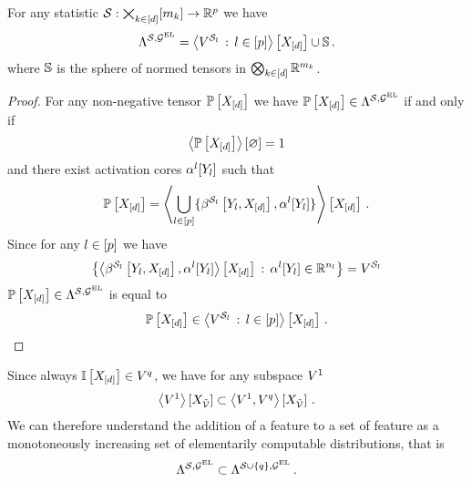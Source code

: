\begin{lemma}
    For any statistic $\mathcal{S}:\bigtimes_{k\in[d]}[m_{k}]\rightarrow\mathbb{R}^{p}$ we have
    \begin{align*}
        \Lambda^{\mathcal{S},\mathcal{G}^{\mathrm{EL}}} = \left\langle V^{\mathcal{S}_{l}} \, : \, l\in[p]\right\rangle \left[ X_{[d]} \right]  \cup \mathbb{S} \, .
    \end{align*}
    where $\mathbb{S}$ is the sphere of normed tensors in $\bigotimes_{k\in[d]} \mathbb{R}^{m_{k}}$.
\end{lemma}
\begin{proof}
    For any non-negative tensor $\mathbb{P}\left[X_{[d]}\right]$ we have $\mathbb{P}\left[X_{[d]}\right]\in\Lambda^{\mathcal{S},\mathcal{G}^{\mathrm{EL}}}$ if and only if
    \begin{align*}
        \left\langle \mathbb{P}\left[X_{[d]}\right]\right\rangle \left[ \varnothing \right]=1
    \end{align*}
    and there exist activation cores $\alpha^{l}[Y_{l}]$ such that
    \begin{align*}
        \mathbb{P}\left[X_{[d]}\right]
        = \left\langle \bigcup_{l\in[p]}\{\beta^{\mathcal{S}_{l}}\left[Y_{l},X_{[d]}\right],\alpha^{l}[Y_{l}]\}\right\rangle \left[ X_{[d]} \right] \, .
    \end{align*}
    Since for any $l\in[p]$ we have
    \begin{align*}
        \left\{\left\langle \beta^{\mathcal{S}_{l}}\left[Y_{l},X_{[d]}\right],\alpha^{l}[Y_{l}]\right\rangle \left[ X_{[d]} \right] \,:\,
        \alpha^{l}[Y_{l}] \in \mathbb{R}^{n_{l}}
        \right\} = V^{\mathcal{S}_{l}}
    \end{align*}
    $\mathbb{P}\left[X_{[d]}\right]\in\Lambda^{\mathcal{S},\mathcal{G}^{\mathrm{EL}}}$ is equal to
    \begin{align*}
        \mathbb{P}\left[X_{[d]}\right] \in \left\langle V^{\mathcal{S}_{l}}\,:\,l\in[p]\right\rangle \left[ X_{[d]} \right] \, .
    \end{align*}
\end{proof}


Since always $\mathbb{I}\left[X_{[d]}\right]\in V^{q}$, we have for any subspace $V^{1}$
\begin{align*}
    \left\langle V^{1}\right\rangle \left[ X_{\tilde{\mathcal{V}}} \right]
    \subset \left\langle V^{1},V^{q}\right\rangle \left[ X_{\tilde{\mathcal{V}}} \right] \, .
\end{align*}
We can therefore understand the addition of a feature to a set of feature as a monotoneously increasing set of elementarily computable distributions, that is
\begin{align*}
    \Lambda^{\mathcal{S},\mathcal{G}^{\mathrm{EL}}} \subset \Lambda^{\mathcal{S}\cup\{q\},\mathcal{G}^{\mathrm{EL}}} \, .
\end{align*}


